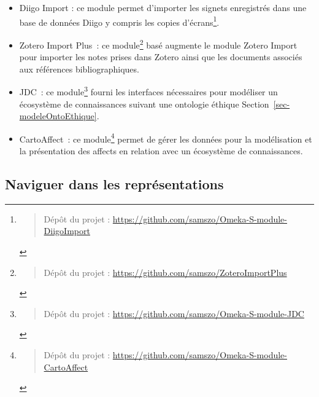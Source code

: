 \documentclass[
  a4paper,
  DIV=11,
  numbers=noendperiod]{scrreprt}
\providecommand{\tightlist}{%
  \setlength{\itemsep}{0pt}\setlength{\parskip}{0pt}}\usepackage{longtable,booktabs,array}
\begin{document}
\begin{itemize}
  \begin{itemize}
  \tightlist
  \item
    Diigo Import : ce module permet d'importer les signets enregistrés
    dans une base de données Diigo y compris les copies
    d'écrans\footnote{\begin{quote}
      Dépôt du projet :
      \url{https://github.com/samszo/Omeka-S-module-DiigoImport}
      \end{quote}}.
  \item
    Zotero Import Plus~: ce module\footnote{\begin{quote}
      Dépôt du projet : \url{https://github.com/samszo/ZoteroImportPlus}
      \end{quote}} basé augmente le module Zotero Import pour importer
    les notes prises dans Zotero ainsi que les documents associés aux
    références bibliographiques.
  \item
    JDC~: ce module\footnote{\begin{quote}
      Dépôt du projet :
      \url{https://github.com/samszo/Omeka-S-module-JDC}
      \end{quote}} fourni les interfaces nécessaires pour modéliser un
    écosystème de connaissances suivant une ontologie éthique
    Section~\ref{sec-modeleOntoEthique}.
  \item
    CartoAffect~: ce module\footnote{\begin{quote}
      Dépôt du projet :
      \url{https://github.com/samszo/Omeka-S-module-CartoAffect}
      \end{quote}} permet de gérer les données pour la modélisation et
    la présentation des affects en relation avec un écosystème de
    connaissances.
  \end{itemize}
\end{itemize}

\subsection{Naviguer dans les
représentations}\label{sec-naviguerRepresentations}
\end{document}

